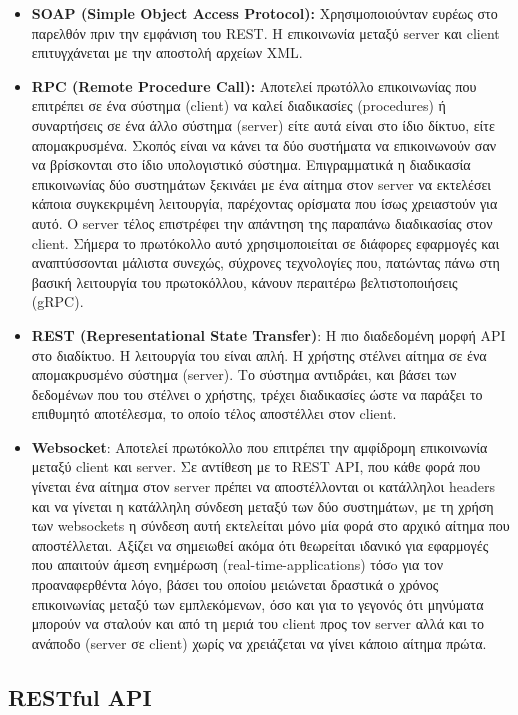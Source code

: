 \begin{itemize}
	\item \textbf{SOAP (Simple Object Access Protocol):} Χρησιμοποιούνταν ευρέως στο παρελθόν πριν την εμφάνιση του REST.
		Η επικοινωνία μεταξύ server και client επιτυγχάνεται με την αποστολή αρχείων XML.
	\item \textbf{RPC (Remote Procedure Call):} Αποτελεί πρωτόλλο επικοινωνίας που επιτρέπει σε ένα σύστημα (client) να καλεί διαδικασίες (procedures)
		ή συναρτήσεις σε ένα άλλο σύστημα (server) είτε αυτά είναι στο ίδιο δίκτυο, είτε απομακρυσμένα. Σκοπός είναι να
		κάνει τα δύο συστήματα να επικοινωνούν σαν να βρίσκονται στο ίδιο υπολογιστικό σύστημα. Επιγραμματικά η διαδικασία
		επικοινωνίας δύο συστημάτων ξεκινάει με ένα αίτημα στον server να εκτελέσει κάποια συγκεκριμένη λειτουργία, παρέχοντας
		ορίσματα που ίσως χρειαστούν για αυτό. Ο server τέλος επιστρέφει την απάντηση της παραπάνω διαδικασίας στον client. Σήμερα το πρωτόκολλο αυτό
		χρησιμοποιείται σε διάφορες εφαρμογές και αναπτύσσονται μάλιστα συνεχώς, σύχρονες τεχνολογίες που, πατώντας πάνω στη βασική λειτουργία
		του πρωτοκόλλου, κάνουν περαιτέρω βελτιστοποιήσεις (gRPC).
	\item \textbf{REST (Representational State Transfer)}: Η πιο διαδεδομένη μορφή API στο διαδίκτυο. Η λειτουργία του είναι απλή. Η χρήστης στέλνει αίτημα σε ένα
		απομακρυσμένο σύστημα (server). Το σύστημα αντιδράει, και βάσει των δεδομένων που του στέλνει ο χρήστης, τρέχει διαδικασίες ώστε να παράξει το
		επιθυμητό αποτέλεσμα, το οποίο τέλος αποστέλλει στον client.
	\item \textbf{Websocket}: Αποτελεί πρωτόκολλο που επιτρέπει την αμφίδρομη επικοινωνία μεταξύ client και server. Σε αντίθεση με το REST API, που κάθε φορά
		που γίνεται ένα αίτημα στον server πρέπει να αποστέλλονται οι κατάλληλοι headers και να γίνεται η κατάλληλη σύνδεση μεταξύ των δύο συστημάτων, με τη χρήση των websockets
		η σύνδεση αυτή εκτελείται μόνο μία φορά στο αρχικό αίτημα που αποστέλλεται. Αξίζει να σημειωθεί ακόμα ότι θεωρείται ιδανικό για εφαρμογές που απαιτούν άμεση ενημέρωση \cite{websockets} (real-time-applications)
		τόσo για τον προαναφερθέντα λόγο, βάσει του οποίου μειώνεται δραστικά ο χρόνος επικοινωνίας μεταξύ των εμπλεκόμενων, όσο και για το γεγονός ότι
		μηνύματα μπορούν να σταλούν και από τη μεριά του client προς τον server αλλά και το ανάποδο (server σε client) χωρίς να χρειάζεται να γίνει κάποιο αίτημα πρώτα.
\end{itemize}

\subsection{RESTful API}
\label{subsec:rest_api}

